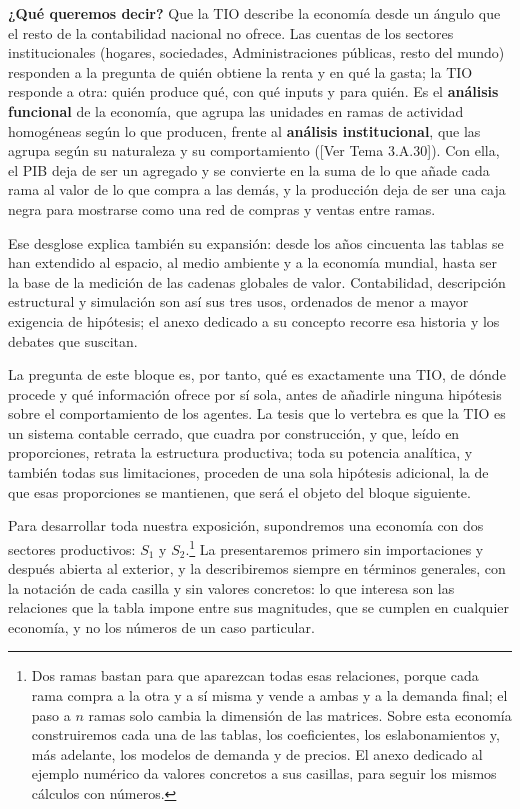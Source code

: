 \documentclass[10pt,a4paper]{article}
\newcommand{\authorfont}[1]{{\fontfamily{EBGaramond-TLF}\selectfont #1}}
\newcounter{anexo}
\begin{document}
\textbf{¿Qué queremos decir?} Que la TIO describe la economía desde un ángulo que el resto de la contabilidad nacional no ofrece. Las cuentas de los sectores institucionales (hogares, sociedades, Administraciones públicas, resto del mundo) responden a la pregunta de quién obtiene la renta y en qué la gasta; la TIO responde a otra: quién produce qué, con qué inputs y para quién. Es el \textbf{análisis funcional} de la economía, que agrupa las unidades en ramas de actividad homogéneas según lo que producen, frente al \textbf{análisis institucional}, que las agrupa según su naturaleza y su comportamiento ([\authorfont{Ver Tema 3.A.30}]). Con ella, el PIB deja de ser un agregado y se convierte en la suma de lo que añade cada rama al valor de lo que compra a las demás, y la producción deja de ser una caja negra para mostrarse como una red de compras y ventas entre ramas.

Ese desglose explica también su expansión: desde los años cincuenta las tablas se han extendido al espacio, al medio ambiente y a la economía mundial, hasta ser la base de la medición de las cadenas globales de valor. Contabilidad, descripción estructural y simulación son así sus tres usos, ordenados de menor a mayor exigencia de hipótesis; el anexo dedicado a su concepto recorre esa historia y los debates que suscitan.

La pregunta de este bloque es, por tanto, qué es exactamente una TIO, de dónde procede y qué información ofrece por sí sola, antes de añadirle ninguna hipótesis sobre el comportamiento de los agentes. La tesis que lo vertebra es que la TIO es un sistema contable cerrado, que cuadra por construcción, y que, leído en proporciones, retrata la estructura productiva; toda su potencia analítica, y también todas sus limitaciones, proceden de una sola hipótesis adicional, la de que esas proporciones se mantienen, que será el objeto del bloque siguiente.

Para desarrollar toda nuestra exposición, supondremos una economía con dos sectores productivos: $S_1$ y $S_2$.\footnote{%
  Dos ramas bastan para que aparezcan todas esas relaciones, porque cada rama compra a la otra y a sí misma y vende a ambas y a la demanda final; el paso a $n$ ramas solo cambia la dimensión de las matrices. Sobre esta economía construiremos cada una de las tablas, los coeficientes, los eslabonamientos y, más adelante, los modelos de demanda y de precios. El anexo dedicado al ejemplo numérico da valores concretos a sus casillas, para seguir los mismos cálculos con números.
} La presentaremos primero sin importaciones y después abierta al exterior, y la describiremos siempre en términos generales, con la notación de cada casilla y sin valores concretos: lo que interesa son las relaciones que la tabla impone entre sus magnitudes, que se cumplen en cualquier economía, y no los números de un caso particular. 
\end{document}
